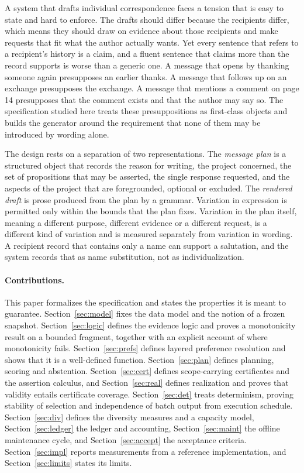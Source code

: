 \documentclass[11pt]{article}
\theoremstyle{definition}
\theoremstyle{remark}
\begin{document}
A system that drafts individual correspondence faces a tension that is easy to state and hard to enforce. The drafts should differ because the recipients differ, which means they should draw on evidence about those recipients and make requests that fit what the author actually wants. Yet every sentence that refers to a recipient's history is a claim, and a fluent sentence that claims more than the record supports is worse than a generic one. A message that opens by thanking someone again presupposes an earlier thanks. A message that follows up on an exchange presupposes the exchange. A message that mentions a comment on page 14 presupposes that the comment exists and that the author may say so. The specification studied here treats these presuppositions as first-class objects and builds the generator around the requirement that none of them may be introduced by wording alone.

The design rests on a separation of two representations. The \emph{message plan} is a structured object that records the reason for writing, the project concerned, the set of propositions that may be asserted, the single response requested, and the aspects of the project that are foregrounded, optional or excluded. The \emph{rendered draft} is prose produced from the plan by a grammar. Variation in expression is permitted only within the bounds that the plan fixes. Variation in the plan itself, meaning a different purpose, different evidence or a different request, is a different kind of variation and is measured separately from variation in wording. A recipient record that contains only a name can support a salutation, and the system records that as name substitution, not as individualization.

\paragraph{Contributions.} This paper formalizes the specification and states the properties it is meant to guarantee. Section~\ref{sec:model} fixes the data model and the notion of a frozen snapshot. Section~\ref{sec:logic} defines the evidence logic and proves a monotonicity result on a bounded fragment, together with an explicit account of where monotonicity fails. Section~\ref{sec:prefs} defines layered preference resolution and shows that it is a well-defined function. Section~\ref{sec:plan} defines planning, scoring and abstention. Section~\ref{sec:cert} defines scope-carrying certificates and the assertion calculus, and Section~\ref{sec:real} defines realization and proves that validity entails certificate coverage. Section~\ref{sec:det} treats determinism, proving stability of selection and independence of batch output from execution schedule. Section~\ref{sec:div} defines the diversity measures and a capacity model, Section~\ref{sec:ledger} the ledger and accounting, Section~\ref{sec:maint} the offline maintenance cycle, and Section~\ref{sec:accept} the acceptance criteria. Section~\ref{sec:impl} reports measurements from a reference implementation, and Section~\ref{sec:limits} states its limits.
\end{document}
